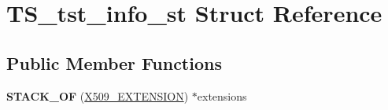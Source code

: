 \hypertarget{struct_t_s__tst__info__st}{}\section{T\+S\+\_\+tst\+\_\+info\+\_\+st Struct Reference}
\label{struct_t_s__tst__info__st}
\subsection*{Public Member Functions}
\begin{DoxyCompactItemize}
\item 
\mbox{\label{struct_t_s__tst__info__st_aed2c28090eea24c3b1b8811cc32af73a}} 
{\bfseries S\+T\+A\+C\+K\+\_\+\+OF} (\hyperlink{struct_x509__extension__st}{X509\+\_\+\+E\+X\+T\+E\+N\+S\+I\+ON}) $\ast$extensions
\end{DoxyCompactItemize}
